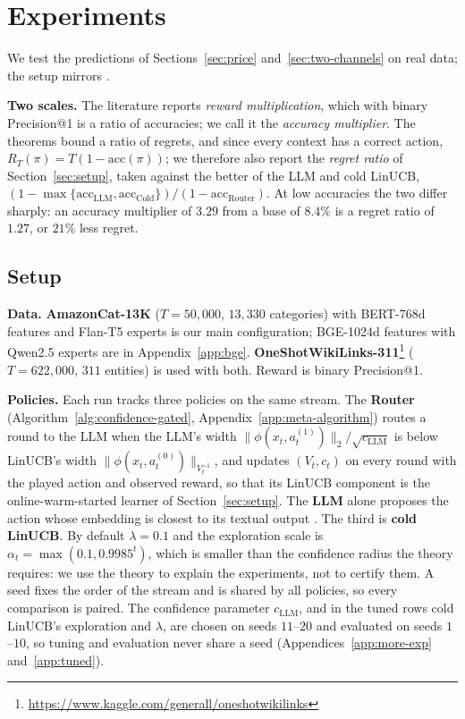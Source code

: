 \documentclass[anon]{alt2027} %
\begin{document}
\section{Experiments}
\label{sec:experiments}

We test the predictions of Sections~\ref{sec:price}
and~\ref{sec:two-channels} on real data; the setup mirrors
\citet{chen2024llmdecision}.

\textbf{Two scales.} The literature reports \emph{reward multiplication},
which with binary Precision@1 is a ratio of accuracies; we call it the
\emph{accuracy multiplier}. The theorems bound a ratio of regrets, and since
every context has a correct action, $R_T(\pi)=T(1-\mathrm{acc}(\pi))$; we
therefore also report the \emph{regret ratio} of Section~\ref{sec:setup}, taken
against the better of the LLM and cold LinUCB,
$(1-\max\{\mathrm{acc}_{\mathrm{LLM}},\mathrm{acc}_{\mathrm{Cold}}\})/(1-\mathrm{acc}_{\mathrm{Router}})$.
At low accuracies the two differ sharply: an accuracy multiplier of $3.29$
from a base of $8.4\%$ is a regret ratio of $1.27$, or $21\%$ less regret.

\subsection{Setup}
\label{sec:exp-setup}

\textbf{Data.} \textbf{AmazonCat-13K} \citep{bhatia2016extreme}
($T\!=\!50{,}000$, $13{,}330$ categories) with BERT-768d features and Flan-T5
experts is our main configuration; BGE-1024d features with Qwen2.5 experts
are in Appendix~\ref{app:bge}. \textbf{OneShotWikiLinks-311}\footnote{\url{https://www.kaggle.com/generall/oneshotwikilinks}}
($T\!=\!622{,}000$, $311$ entities) is used with both. Reward is binary
Precision@1.

\textbf{Policies.} Each run tracks three policies on the same stream. The
\textbf{Router} (Algorithm~\ref{alg:confidence-gated},
Appendix~\ref{app:meta-algorithm}) routes a round to the LLM when the LLM's
width $\|\phi(x_t,a_t^{(1)})\|_2/\sqrt{c_{\mathrm{LLM}}}$ is below LinUCB's
width $\|\phi(x_t,a_t^{(0)})\|_{V_t^{-1}}$, and updates $(V_t,c_t)$ on every
round with the played action and observed reward, so that its LinUCB
component is the online-warm-started learner of Section~\ref{sec:setup}. The
\textbf{LLM} alone proposes the action whose embedding is closest to its
textual output \citep{chen2024llmdecision}. The third is \textbf{cold
LinUCB}. By default $\lambda=0.1$ and the exploration scale is
$\alpha_t=\max(0.1,0.9985^t)$, which is smaller than the confidence radius
the theory requires: we use the theory to explain the experiments, not to
certify them. A seed fixes the order of the stream and is shared by all
policies, so every comparison is paired. The confidence parameter
$c_{\mathrm{LLM}}$, and in the tuned rows cold LinUCB's exploration and
$\lambda$, are chosen on seeds $11$--$20$ and evaluated on seeds $1$--$10$, so
tuning and evaluation never share a seed (Appendices~\ref{app:more-exp}
and~\ref{app:tuned}).
\end{document}

